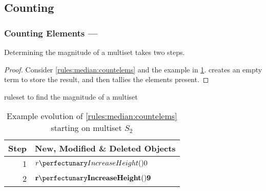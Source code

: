 
\subsection{Counting}\label{sec:median:counting}

\subsubsection{Counting Elements --- }\label{sec:median:countelems}

\begin{proposition}\label{prop:median:countelems}
Determining the magnitude of a multiset takes two steps.
\end{proposition}

\begin{proof}
Consider \cref{rules:median:countelems} and the example in \cref{tab:median:countelems}.   creates an empty term to store the result, and then  tallies the elements present.
\end{proof}

\begin{cprulesetfloat} \begin{cpruleset}



\end{cpruleset}
\caption{\label{rules:median:countelems}\Gls{ruleset} to find the magnitude of a multiset}
\end{cprulesetfloat}

\begin{table}[htbp]
\centering
   \begin{tabular}{|r|l|}
    \hline
    \textbf{Step} & \textbf{New, Modified \& Deleted Objects} \\ \hline
    1 & \(\cpfunc{r}{0}\)\\ \hline
    
    2 & \(\mathbf{\cpfunc{r}{9}}\)\\ \hline
\end{tabular}
\caption[Example evolution of \cref{rules:median:countelems} to find the magnitude of a multiset]{\label{tab:median:countelems}Example evolution of \cref{rules:median:countelems} starting on multiset \(S_2\)}
\end{table}

